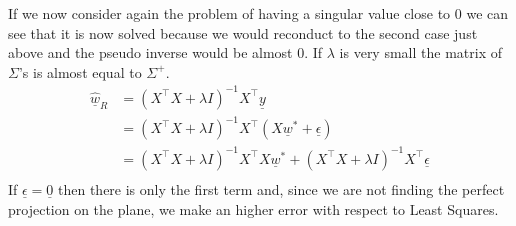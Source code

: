 If we now consider again the problem of having a singular value close to 0 we can see that it is now solved because we would reconduct to the second case just above and the pseudo inverse would be almost 0. 
If $\lambda$ is very small the matrix of $\Sigma$'s is almost equal to $\Sigma^+$.
\[
    \begin{split}
        \underline{\hat{w}}_R &= (X^\intercal X + \lambda I)^{-1} X^\intercal \underline{y}\\
        &= (X^\intercal X + \lambda I)^{-1} X^\intercal(X\underline{w}^* + \underline{\epsilon})\\
        &= (X^\intercal X + \lambda I)^{-1} X^\intercal X\underline{w}^* + (X^\intercal X + \lambda I)^{-1} X^\intercal \underline{\epsilon}\\
    \end{split}    
\]
If $\underline{\epsilon} = \underline{0}$ then there is only the first term and, since we are not finding the perfect projection on the plane, we make an higher error with respect to Least Squares. 


